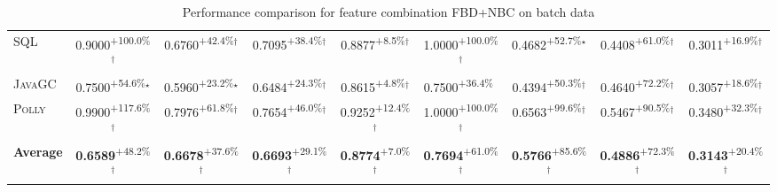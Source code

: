 \begin{table}[htbp]
\begin{tabular}{l|cccc|cccc}
\textsc{SQL} & \cellcolor{green!30}0.9000\textsuperscript{+100.0\%}$^\dagger$ & \cellcolor{green!30}0.6760\textsuperscript{+42.4\%}$^\dagger$ & \cellcolor{green!30}0.7095\textsuperscript{+38.4\%}$^\dagger$ & \cellcolor{green!30}0.8877\textsuperscript{+8.5\%}$^\dagger$ & \cellcolor{green!30}1.0000\textsuperscript{+100.0\%}$^\dagger$ & \cellcolor{green!30}0.4682\textsuperscript{+52.7\%}$^\star$ & \cellcolor{green!30}0.4408\textsuperscript{+61.0\%}$^\dagger$ & \cellcolor{green!30}0.3011\textsuperscript{+16.9\%}$^\dagger$ \\
\textsc{JavaGC} & \cellcolor{green!30}0.7500\textsuperscript{+54.6\%}$^\star$ & \cellcolor{green!30}0.5960\textsuperscript{+23.2\%}$^\star$ & \cellcolor{green!30}0.6484\textsuperscript{+24.3\%}$^\dagger$ & \cellcolor{green!30}0.8615\textsuperscript{+4.8\%}$^\dagger$ & \cellcolor{green!30}0.7500\textsuperscript{+36.4\%}$^{\,\,\,}$ & \cellcolor{green!30}0.4394\textsuperscript{+50.3\%}$^\dagger$ & \cellcolor{green!30}0.4640\textsuperscript{+72.2\%}$^\dagger$ & \cellcolor{green!30}0.3057\textsuperscript{+18.6\%}$^\dagger$ \\
\textsc{Polly} & \cellcolor{green!30}0.9900\textsuperscript{+117.6\%}$^\dagger$ & \cellcolor{green!30}0.7976\textsuperscript{+61.8\%}$^\dagger$ & \cellcolor{green!30}0.7654\textsuperscript{+46.0\%}$^\dagger$ & \cellcolor{green!30}0.9252\textsuperscript{+12.4\%}$^\dagger$ & \cellcolor{green!30}1.0000\textsuperscript{+100.0\%}$^\dagger$ & \cellcolor{green!30}0.6563\textsuperscript{+99.6\%}$^\dagger$ & \cellcolor{green!30}0.5467\textsuperscript{+90.5\%}$^\dagger$ & \cellcolor{green!30}0.3480\textsuperscript{+32.3\%}$^\dagger$ \\
\hline
\textbf{Average} & \cellcolor{green!30}\textbf{0.6589}\textsuperscript{+48.2\%}$^\dagger$ & \cellcolor{green!30}\textbf{0.6678}\textsuperscript{+37.6\%}$^\dagger$ & \cellcolor{green!30}\textbf{0.6693}\textsuperscript{+29.1\%}$^\dagger$ & \cellcolor{green!30}\textbf{0.8774}\textsuperscript{+7.0\%}$^\dagger$ & \cellcolor{green!30}\textbf{0.7694}\textsuperscript{+61.0\%}$^\dagger$ & \cellcolor{green!30}\textbf{0.5766}\textsuperscript{+85.6\%}$^\dagger$ & \cellcolor{green!30}\textbf{0.4886}\textsuperscript{+72.3\%}$^\dagger$ & \cellcolor{green!30}\textbf{0.3143}\textsuperscript{+20.4\%}$^\dagger$ \\
\hline
\end{tabular}
\caption{Performance comparison for feature combination FBD+NBC on batch data}
\label{tab:combo_FBD_NBC_performance_batch}
\end{table}